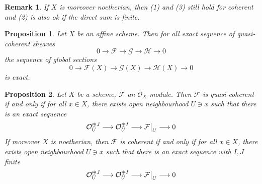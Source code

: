 \documentclass{ctexart}
\newtheorem{remark}{Remark}[section]
\newtheorem{proposition}{Proposition}[section]
\begin{document}
\begin{remark}
    If $X$ is moreover noetherian, then (1) and (3) still hold for coherent and (2) is also ok if the direct sum is finite.
\end{remark}
\begin{proposition}
    Let $X$ be an affine scheme.
    Then for all exact sequence of quasi-coherent sheaves 
    \begin{equation}
        0 \longrightarrow \mathcal{F} \longrightarrow \mathcal{G} \longrightarrow \mathcal{H} \longrightarrow 0
    \end{equation}
    the sequence of global sections 
    \begin{equation}
        0 \longrightarrow \mathcal{F}(X) \longrightarrow \mathcal{G}(X) \longrightarrow \mathcal{H}(X) \longrightarrow 0
    \end{equation}
    is exact.
    \label{Proposition 1.8}
\end{proposition}
\begin{proposition}
    Let $X$ be a scheme, $\mathcal{F}$ an $\mathcal{O}_{X}$-module.
    Then $\mathcal{F}$ is quasi-coherent if and only if for all $x\in X$, 
    there exists open neighbourhood $U\ni x$ such that there is an exact sequence
    \begin{equation}
        \mathcal{O}_{U}^{\oplus J} \longrightarrow \mathcal{O}_{U}^{\oplus I} \longrightarrow \mathcal{F}\big{|}_{U} \longrightarrow 0
    \end{equation}
    If moreover $X$ is noetherian,
    then $\mathcal{F}$ is coherent if and only if for all $x\in X$, 
    there exists open neighbourhood $U\ni x$ such that there is an exact sequence with $I,J$ finite
    \begin{equation}
        \mathcal{O}_{U}^{\oplus J} \longrightarrow \mathcal{O}_{U}^{\oplus I} \longrightarrow \mathcal{F}\big{|}_{U} \longrightarrow 0
    \end{equation}
    \label{Proposition 1.9}
\end{proposition}
\end{document}
